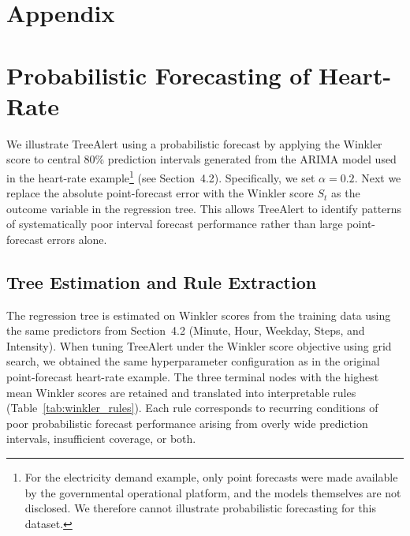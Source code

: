 \documentclass[12pt]{article}
\begin{document}
{


}



\appendix
\section*{Appendix}

\section{Probabilistic Forecasting of Heart-Rate}
\label{probabilistic_treealert}

We illustrate TreeAlert using a probabilistic forecast by applying the Winkler score to central 80\% prediction intervals generated from the ARIMA model used in the heart-rate example\footnote{For the electricity demand example, only point forecasts were made available by the governmental operational platform, and the models themselves are not disclosed. We therefore cannot illustrate probabilistic forecasting for this dataset.} (see Section~4.2). Specifically, we set $\alpha=0.2$. Next we replace the absolute point-forecast error with the Winkler score $S_t$ as the outcome variable in the regression tree. This allows TreeAlert to identify patterns of systematically poor interval forecast performance rather than large point-forecast errors alone.

\subsection{Tree Estimation and Rule Extraction}

The regression tree is estimated on Winkler scores from the training data using the same predictors from Section~4.2 (Minute, Hour, Weekday, Steps, and Intensity). When tuning TreeAlert under the Winkler score objective using grid search, we obtained the same hyperparameter configuration as in the original point-forecast heart-rate example. The three terminal nodes with the highest mean Winkler scores are retained and translated into interpretable rules (Table~\ref{tab:winkler_rules}). Each rule corresponds to recurring conditions of poor probabilistic forecast performance arising from overly wide prediction intervals, insufficient coverage, or both.
\end{document}
